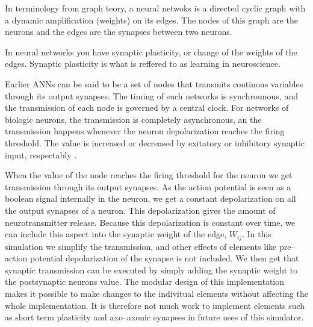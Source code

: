 	In terminology from graph teory, a neural netwoks is a directed cyclic graph with a dynamic amplification (weights) on its edges.
	The nodes of this graph are the neurons and the edges are the synapses between two neurons.%

	In neural networks you have synaptic plasticity, or change of the weights of the edges. Synaptic plasticity is what is reffered to as learning in neuroscience. %


	Earlier ANNs can be said to be a set of nodes that transmits continous variables through its output synapses. The timing of such networks is synchrounous, and the transmission of each node is governed by a central clock.
	For networks of biologic neurons, the transmission is completely asynchronous, an the transmission happens whenever the neuron depolarization reaches the firing threshold.
	The value is increased or decreased by exitatory or inhibitory synaptic input, respectably .
	
	When the value of the node reaches the firing threshold for the neuron we get transmission through its output synapses.
	As the action potential is seen as a boolean signal internally in the neuron, we get a constant depolarization on all the output synapses of a neuron.
	This depolarization gives the amount of neurotransmitter release. 
	Because this depolarization is constant over time, we can include this aspect into the synaptic weight of the edge, $W_{ij}$.
	In this simulation we simplify the transmission, and other effects of elements like pre--action potential depolarization of the synapse is not included.%
	We then get that synaptic transmission can be executed by simply adding the synaptic weight to the postsynaptic neurons value.
	The modular design of this implementation makes it possible to make changes to the indivitual elements without affecting the whole implementation.
	It is therefore not much work to implement elements such as short term plasticity and axo--axonic synapses in future uses of this simulator.

